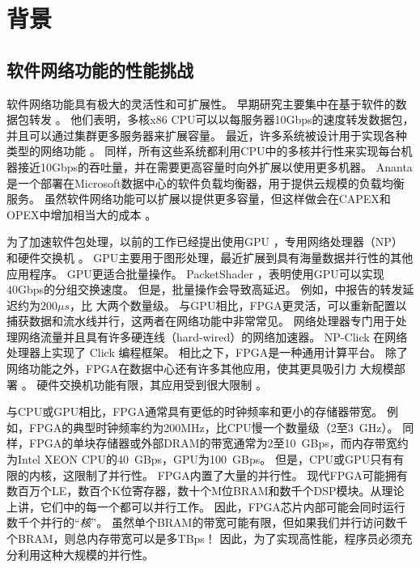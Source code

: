 \section{背景}
\label{clicknp:sec:background}

\subsection{软件网络功能的性能挑战}

软件网络功能具有极大的灵活性和可扩展性。
早期研究主要集中在基于软件的数据包转发 \cite {routebricks,Egi:2008:THP:1544012.1544032}。
他们表明，多核x86 CPU可以以每服务器10Gbps的速度转发数据包，并且可以通过集群更多服务器来扩展容量。
最近，许多系统被设计用于实现各种类型的网络功能 \cite {comb,Greenhalgh:2009:FPR:1517480.1517484,martins2014clickos}。
同样，所有这些系统都利用CPU中的多核并行性来实现每台机器接近10Gbps的吞吐量，并在需要更高容量时向外扩展以使用更多机器。
Ananta \cite {ananta}是一个部署在Microsoft数据中心的软件负载均衡器，用于提供云规模的负载均衡服务。
虽然软件网络功能可以扩展以提供更多容量，但这样做会在CAPEX和OPEX中增加相当大的成本 \cite {ananta,duet}。

为了加速软件包处理，以前的工作已经提出使用GPU \cite {packetshader}，专用网络处理器（NP）\cite {cavium,netronome} 和硬件交换机 \cite {duet}。
GPU主要用于图形处理，最近扩展到具有海量数据并行性的其他应用程序。 GPU更适合批量操作。 PacketShader \cite {packetshader}，表明使用GPU可以实现40Gbps的分组交换速度。
但是，批量操作会导致高延迟。
例如，\cite {packetshader}中报告的转发延迟约为$200 \mu{}s$，比 \name{} 大两个数量级。
与GPU相比，FPGA更灵活，可以重新配置以捕获数据和流水线并行，这两者在网络功能中非常常见。
网络处理器专门用于处理网络流量并且具有许多硬连线（hard-wired）的网络加速器。
NP-Click \cite{shah2004np} 在网络处理器上实现了 Click 编程框架。
相比之下，FPGA是一种通用计算平台。
除了网络功能之外，FPGA在数据中心还有许多其他应用，使其更具吸引力
大规模部署 \cite {putnam2014reconfigurable}。
硬件交换机功能有限，其应用受到很大限制 \cite {duet}。

与CPU或GPU相比，FPGA通常具有更低的时钟频率和更小的存储器带宽。
例如，FPGA的典型时钟频率约为200MHz，比CPU慢一个数量级（2至3~GHz）。
同样，FPGA的单块存储器或外部DRAM的带宽通常为2至10~GBps，而内存带宽约为Intel XEON CPU的40~GBps，GPU为100~GBps。
但是，CPU或GPU只有有限的内核，这限制了并行性。 FPGA内置了大量的并行性。
现代FPGA可能拥有数百万个LE，数百个K位寄存器，数十个M位BRAM和数千个DSP模块。从理论上讲，它们中的每一个都可以并行工作。
因此，FPGA芯片内部可能会同时运行数千个并行的``\textit {核}''。
虽然单个BRAM的带宽可能有限，但如果我们并行访问数千个BRAM，则总内存带宽可以是多TBps！
因此，为了实现高性能，程序员必须充分利用这种大规模的并行性。

